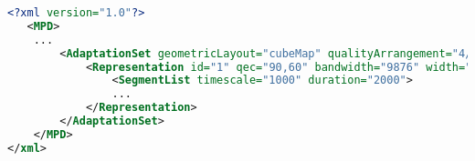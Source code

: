 \begin{lstlisting}[language=xml, frame=single, backgroundcolor=\color{white}, caption=Extensions of MPD file]
<?xml version="1.0"?>
   <MPD>
    ...
        <AdaptationSet geometricLayout="cubeMap" qualityArrangement="4/1/1">
            <Representation id="1" qec="90,60" bandwidth="9876" width="1920" height="1080" frameRate="30">
                <SegmentList timescale="1000" duration="2000">
                ...
            </Representation>
        </AdaptationSet>
    </MPD>
</xml>
\end{lstlisting}
\label{fig:mpdChanges}






